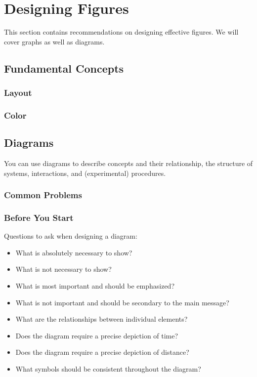  
\chapter{Designing Figures}

This section contains recommendations on designing effective figures. We will cover graphs as well as diagrams.

\section{Fundamental Concepts}

\subsection{Layout}


% 

\subsection{Color}

\section{Diagrams}

You can use diagrams to describe concepts and their relationship, the structure of systems, interactions, and (experimental) procedures.

\subsection{Common Problems}



\subsection{Before You Start}

Questions to ask when designing a diagram:
\begin{itemize}
\item What is absolutely necessary to show?
\item What is not necessary to show?
\item What is most important and should be emphasized?
\item What is not important and should be secondary to the main message?
\item What are the relationships between individual elements?
\item Does the diagram require a precise depiction of time?
\item Does the diagram require a precise depiction of distance?
\item What symbols should be consistent throughout the diagram?
\end{itemize}


